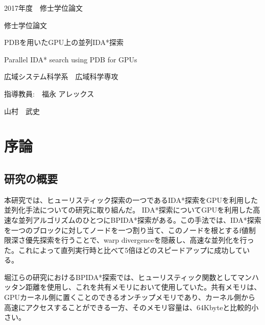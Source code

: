 \documentclass[a4paper,11pt,oneside,openany]{jsbook}
\begin{document}
\thispagestyle{empty}
2017年度　修士学位論文%
\bigskip%
\LARGE%
\begin{center}
修士学位論文
\end{center}
\bigskip\bigskip\bigskip\bigskip\bigskip\bigskip\bigskip %
\begin{center} %
PDBを用いたGPU上の並列IDA*探索
\end{center}
\large %
\begin{center}
Parallel IDA* search using PDB for GPUs 
\end{center}
\bigskip\bigskip\bigskip\bigskip\bigskip\bigskip\bigskip\bigskip\bigskip\bigskip
\bigskip\bigskip\bigskip\bigskip\bigskip\bigskip\bigskip\bigskip\bigskip
\Large %
\begin{center}
広域システム科学系　広域科学専攻
\end{center}
\Large %
\begin{center}
指導教員:　福永 アレックス
\end{center}
\LARGE %
\begin{center}
山村　武史
\end{center}
\normalsize
\thispagestyle{empty}
\setcounter{tocdepth}{3}
\tableofcontents

\chapter{序論}
\section{研究の概要}
本研究では、ヒューリスティック探索の一つであるIDA*探索\cite{Kor85}をGPUを利用した並列化手法についての研究に取り組んだ。
IDA*探索についてGPUを利用した高速な並列アルゴリズムのひとつにBPIDA*探索\cite{HA17}がある。この手法では、IDA*探索を一つのブロックに対してノードを一つ割り当て、このノードを根とするf値制限深さ優先探索を行うことで、warp divergenceを隠蔽し、高速な並列化を行った。これによって直列実行時と比べて5倍ほどのスピードアップに成功している。

堀江らの研究\cite{HA17}におけるBPIDA*探索では、ヒューリスティック関数としてマンハッタン距離を使用し、これを共有メモリにおいて使用していた。共有メモリは、GPUカーネル側に置くことのできるオンチップメモリであり、カーネル側から高速にアクセスすることができる一方、そのメモリ容量は、64Kbyteと比較的小さい。
\end{document}
